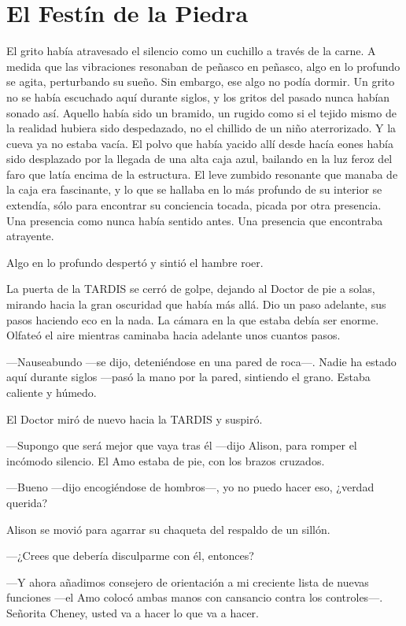 \chapter*{El Festín de la Piedra}

{El grito había atravesado el silencio como un cuchillo a través de la
 carne. A medida que las vibraciones resonaban de peñasco en peñasco, algo en
 lo profundo se agita, perturbando su sueño. Sin
 embargo, ese algo no podía dormir. Un grito no se había escuchado aquí
 durante siglos, y los gritos del pasado nunca habían sonado así. Aquello
 había sido un bramido, un rugido como si el tejido mismo de la realidad
 hubiera sido despedazado, no el chillido de un niño aterrorizado. Y la
 cueva ya no estaba vacía. El polvo que había yacido allí desde hacía
 eones había sido desplazado por la llegada de una alta caja azul,
 bailando en la luz feroz del faro que latía encima de la estructura. El
 leve zumbido resonante que manaba de la caja era fascinante, y lo que se
 hallaba en lo más profundo de su interior se extendía, sólo para
 encontrar su conciencia tocada, picada por otra presencia. Una presencia
 como nunca había sentido antes. Una presencia que encontraba
atrayente.}

{Algo en lo profundo despertó y sintió el hambre roer.}

{La puerta de la TARDIS se cerró de golpe, dejando
 al Doctor de pie a solas, mirando hacia la gran oscuridad que había más
 allá. Dio un paso adelante, sus pasos haciendo eco en la nada. La cámara
 en la que estaba debía ser enorme. Olfateó el aire mientras caminaba
hacia adelante unos cuantos pasos.}

{---Nauseabundo ---se dijo, deteniéndose en una pared de roca---. Nadie
 ha estado aquí durante siglos ---pasó la mano por la pared, sintiendo el
grano. Estaba caliente y húmedo.}

{El Doctor miró de nuevo hacia la TARDIS y suspiró.}

{---Supongo que será mejor que vaya tras él
 ---dijo Alison, para romper el incómodo silencio. El Amo estaba de pie,
con los brazos cruzados.}

{---Bueno ---dijo encogiéndose de hombros---, yo no puedo hacer eso,
¿verdad querida?}

{Alison se movió para agarrar su chaqueta del respaldo de un sillón.}

{---¿Crees que debería disculparme con él, entonces?}

{---Y ahora añadimos consejero de orientación a mi creciente lista de
 nuevas funciones ---el Amo colocó ambas manos con cansancio contra los
controles---. Señorita Cheney, usted va a hacer lo que va a hacer.}

